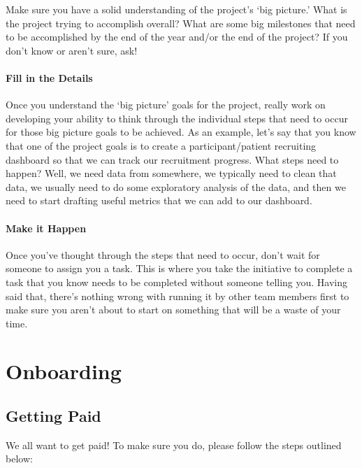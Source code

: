 \documentclass[
  letterpaper,
  DIV=11,
  numbers=noendperiod]{scrreprt}
\begin{document}
Make sure you have a solid understanding of the project's `big picture.'
What is the project trying to accomplish overall? What are some big
milestones that need to be accomplished by the end of the year and/or
the end of the project? If you don't know or aren't sure, ask!

\subsubsection{Fill in the Details}\label{fill-in-the-details}

Once you understand the `big picture' goals for the project, really work
on developing your ability to think through the individual steps that
need to occur for those big picture goals to be achieved. As an example,
let's say that you know that one of the project goals is to create a
participant/patient recruiting dashboard so that we can track our
recruitment progress. What steps need to happen? Well, we need data from
somewhere, we typically need to clean that data, we usually need to do
some exploratory analysis of the data, and then we need to start
drafting useful metrics that we can add to our dashboard.

\subsubsection{Make it Happen}\label{make-it-happen}

Once you've thought through the steps that need to occur, don't wait for
someone to assign you a task. This is where you take the initiative to
complete a task that you know needs to be completed without someone
telling you. Having said that, there's nothing wrong with running it by
other team members first to make sure you aren't about to start on
something that will be a waste of your time.


\chapter{Onboarding}\label{sec-onboarding}

\section{Getting Paid}\label{getting-paid}

We all want to get paid! To make sure you do, please follow the steps
outlined below:
\end{document}
